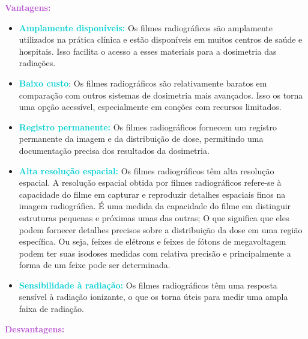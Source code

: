 \documentclass[11pt,a4paper]{article}
\begin{document}
	\begin{tcolorbox}[width=\textwidth, colback={white}, colbacktitle={DarkTurquoise!50!white}, title={$\bigstar$ \LobsterTwo{Filme Radiográfico} $\bigstar$}, coltitle={CarnationPink}, colframe={DarkTurquoise}, fonttitle=\rmfamily\bfseries\Large, breakable]
		\textcolor{MediumOrchid}{\Large\LobsterTwo\textbf{Vantagens:}}

		\begin{itemize}[label=\textcolor{CarnationPink}{$\blacktriangleright$}]
			\item \textcolor{DarkTurquoise}{\textbf{Amplamente disponíveis:}} Os filmes radiográficos são amplamente utilizados na prática clínica e estão disponíveis em muitos centros de saúde e hospitais. Isso facilita o acesso a esses materiais para a dosimetria das radiações.
			\item \textcolor{DarkTurquoise}{\textbf{Baixo custo}}: Os filmes radiográficos são relativamente baratos em comparação com outros sistemas de dosimetria mais avançados. Isso os torna uma opção acessível, especialmente em conções com recursos limitados.
			\item \textcolor{DarkTurquoise}{\textbf{Registro permanente:}} Os filmes radiográficos fornecem um registro permanente da imagem e da distribuição de dose, permitindo uma documentação precisa dos resultados da dosimetria.
			\item \textcolor{DarkTurquoise}{\textbf{Alta resolução espacial:}} Os filmes radiográficos têm alta resolução espacial. A resolução espacial obtida por filmes radiográficos refere-se à capacidade do filme em capturar e reproduzir detalhes espaciais finos na imagem radiográfica. É uma medida da capacidade do filme em distinguir estruturas pequenas e próximas umas das outras; O que significa que eles podem fornecer detalhes precisos sobre a distribuição da dose em uma região específica. Ou seja, feixes de elétrons e feixes de fótons de megavoltagem podem ter suas isodoses medidas com relativa precisão e principalmente a forma de um feixe pode ser determinada.
			\item \textcolor{DarkTurquoise}{\textbf{Sensibilidade à radiação:}} Os filmes radiográficos têm uma resposta sensível à radiação ionizante, o que os torna úteis para medir uma ampla faixa de radiação.
		\end{itemize}

		\textcolor{MediumOrchid}{\Large\LobsterTwo\textbf{Desvantagens:}}


\end{tcolorbox}
\end{document}
